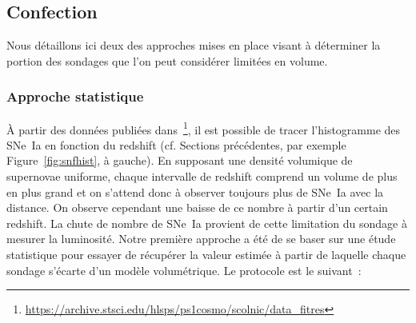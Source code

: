 \documentclass[../main/main.tex]{subfiles}
\begin{document}
\subsection{Confection}\label{ssec:cuts}

Nous détaillons ici deux des approches mises en place visant à déterminer la
portion des sondages que l'on peut considérer limitées en volume.

\subsubsection{Approche statistique}\label{sssec:baserate}

À partir des données publiées dans~\cite{scolnic2018}\footnote{\href{
    https://archive.stsci.edu/hlsps/ps1cosmo/scolnic/data_fitres/}
{https://archive.stsci.edu/hlsps/ps1cosmo/scolnic/data\_fitres}}, il est
possible de tracer l'histogramme des SNe~Ia en fonction du redshift (cf.
Sections précédentes, par exemple Figure~\ref{fig:snfhist}, à gauche). En
supposant une densité volumique de supernovae uniforme, chaque intervalle de
redshift comprend un volume de plus en plus grand et on s'attend donc à observer
toujours plus de SNe~Ia avec la distance. On observe cependant une baisse de ce
nombre à partir d'un certain redshift. La chute de nombre de SNe~Ia provient de
cette limitation du sondage à mesurer la luminosité. Notre première approche a
été de se baser sur une étude statistique pour essayer de récupérer la valeur
estimée à partir de laquelle chaque sondage s'écarte d'un modèle volumétrique.
Le protocole est le suivant~:
\end{document}
